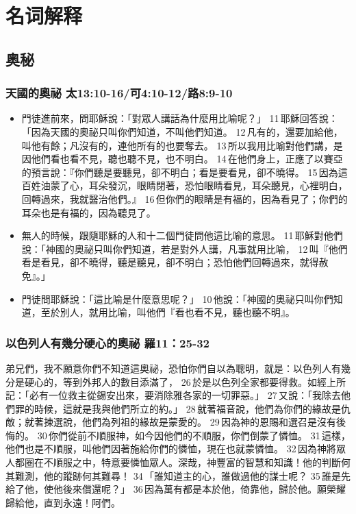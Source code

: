 \section{名词解释}
\subsection{奥秘}
 


\subsubsection{天國的奧祕 太13:10-16/可4:10-12/路8:9-10}
\begin{itemize}
\item 門徒進前來，問耶穌說：「對眾人講話為什麼用比喻呢？」 11 耶穌回答說：「因為天國的奧祕只叫你們知道，不叫他們知道。 12 凡有的，還要加給他，叫他有餘；凡沒有的，連他所有的也要奪去。 13 所以我用比喻對他們講，是因他們看也看不見，聽也聽不見，也不明白。 14 在他們身上，正應了以賽亞的預言說：『你們聽是要聽見，卻不明白；看是要看見，卻不曉得。 15 因為這百姓油蒙了心，耳朵發沉，眼睛閉著，恐怕眼睛看見，耳朵聽見，心裡明白，回轉過來，我就醫治他們。』 16 但你們的眼睛是有福的，因為看見了；你們的耳朵也是有福的，因為聽見了。
\item 無人的時候，跟隨耶穌的人和十二個門徒問他這比喻的意思。 11 耶穌對他們說：「神國的奧祕只叫你們知道，若是對外人講，凡事就用比喻， 12 叫『他們看是看見，卻不曉得，聽是聽見，卻不明白；恐怕他們回轉過來，就得赦免』。」
\item 門徒問耶穌說：「這比喻是什麼意思呢？」 10 他說：「神國的奧祕只叫你們知道，至於別人，就用比喻，叫他們『看也看不見，聽也聽不明』。
\end{itemize}



\subsubsection{以色列人有幾分硬心的奧祕 羅11：25-32}
弟兄們，我不願意你們不知道這奧祕，恐怕你們自以為聰明，就是：以色列人有幾分是硬心的，等到外邦人的數目添滿了， 26 於是以色列全家都要得救。如經上所記：「必有一位救主從錫安出來，要消除雅各家的一切罪惡。」 27 又說：「我除去他們罪的時候，這就是我與他們所立的約。」 28 就著福音說，他們為你們的緣故是仇敵；就著揀選說，他們為列祖的緣故是蒙愛的。 29 因為神的恩賜和選召是沒有後悔的。 30 你們從前不順服神，如今因他們的不順服，你們倒蒙了憐恤。 31 這樣，他們也是不順服，叫他們因著施給你們的憐恤，現在也就蒙憐恤。 32 因為神將眾人都圈在不順服之中，特意要憐恤眾人。深哉，神豐富的智慧和知識！他的判斷何其難測，他的蹤跡何其難尋！ 34 「誰知道主的心，誰做過他的謀士呢？ 35 誰是先給了他，使他後來償還呢？」 36 因為萬有都是本於他，倚靠他，歸於他。願榮耀歸給他，直到永遠！阿們。
